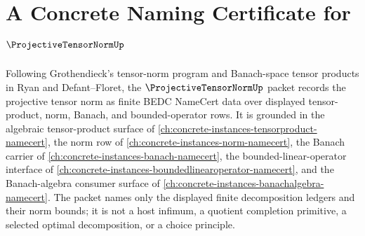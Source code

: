 \chapter{A Concrete Naming Certificate for $\ProjectiveTensorNormUp$}
\label{ch:concrete-instances-projective-tensor-norm-namecert}

Following Grothendieck's tensor-norm program and Banach-space tensor products in Ryan and Defant--Floret, the $\ProjectiveTensorNormUp$ packet records the projective tensor norm as finite BEDC NameCert data over displayed tensor-product, norm, Banach, and bounded-operator rows. It is grounded in the algebraic tensor-product surface of \autoref{ch:concrete-instances-tensorproduct-namecert}, the norm row of \autoref{ch:concrete-instances-norm-namecert}, the Banach carrier of \autoref{ch:concrete-instances-banach-namecert}, the bounded-linear-operator interface of \autoref{ch:concrete-instances-boundedlinearoperator-namecert}, and the Banach-algebra consumer surface of \autoref{ch:concrete-instances-banachalgebra-namecert}. The packet names only the displayed finite decomposition ledgers and their norm bounds; it is not a host infimum, a quotient completion primitive, a selected optimal decomposition, or a choice principle.

